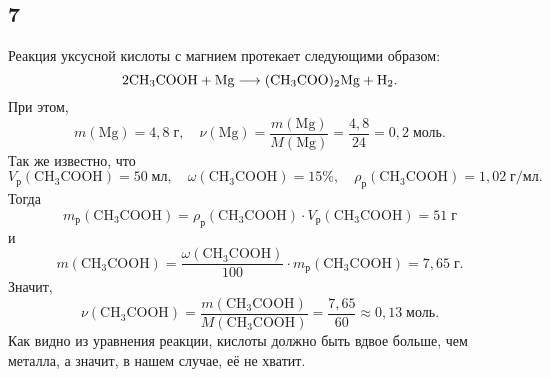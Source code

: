 \subsection{7}

Реакция уксусной кислоты с магнием протекает следующими образом:
\[
\rm 2CH_3COOH+Mg\longrightarrow (CH_3COO)_2Mg+H_2.
\]
При этом,
\[
m(\mathrm{Mg})=4{,}8\;\text{г},\quad\nu(\mathrm{Mg})=\frac{m(\mathrm{Mg})}{M(\mathrm{Mg})}=\frac{4{,}8}{24}=0{,}2\;\text{моль}.
\]
Так же известно, что
\[
V_\text{р}(\mathrm{CH_3COOH})=50\;\text{мл},\quad\omega(\mathrm{CH_3COOH})=15\%,\quad\rho_\text{р}(\mathrm{CH_3COOH})=1{,}02\;\text{г/мл}.
\]
Тогда
\[
m_\text{р}(\mathrm{CH_3COOH})=\rho_\text{р}(\mathrm{CH_3COOH})\cdot V_\text{р}(\mathrm{CH_3COOH})=51\;\text{г}
\]
и
\[
m(\mathrm{CH_3COOH})=\frac{\omega(\mathrm{CH_3COOH})}{100}\cdot m_\text{р}(\mathrm{CH_3COOH})=7{,}65\;\text{г}.
\]
Значит,
\[
\nu(\mathrm{CH_3COOH})=\frac{m(\mathrm{CH_3COOH})}{M(\mathrm{CH_3COOH})}=\frac{7{,}65}{60}\approx0{,}13\;\text{моль}. 
\]
Как видно из уравнения реакции, кислоты должно быть вдвое больше, чем металла, а значит, в нашем случае, её не хватит.